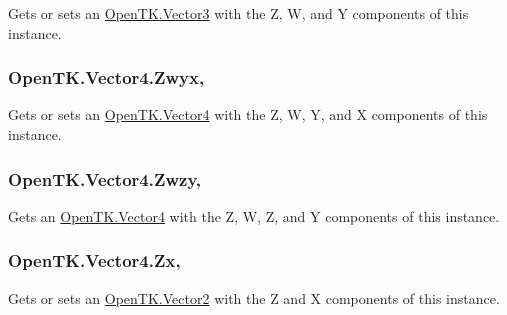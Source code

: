Gets or sets an \hyperlink{struct_open_t_k_1_1_vector3}{Open\-T\-K.\-Vector3} with the Z, W, and Y components of this instance. 

\hypertarget{struct_open_t_k_1_1_vector4_acfd06f4daca5c108a34e8793304e5611}{
\subsubsection[{Zwyx}]{ Open\-T\-K.\-Vector4.\-Zwyx\hspace{0.3cm}{\ttfamily [get]}, {\ttfamily [set]}}}\label{struct_open_t_k_1_1_vector4_acfd06f4daca5c108a34e8793304e5611}


Gets or sets an \hyperlink{struct_open_t_k_1_1_vector4}{Open\-T\-K.\-Vector4} with the Z, W, Y, and X components of this instance. 

\hypertarget{struct_open_t_k_1_1_vector4_a2e2e6a3430dce9badae994c716473602}{
\subsubsection[{Zwzy}]{ Open\-T\-K.\-Vector4.\-Zwzy\hspace{0.3cm}{\ttfamily [get]}, {\ttfamily [set]}}}\label{struct_open_t_k_1_1_vector4_a2e2e6a3430dce9badae994c716473602}


Gets an \hyperlink{struct_open_t_k_1_1_vector4}{Open\-T\-K.\-Vector4} with the Z, W, Z, and Y components of this instance. 

\hypertarget{struct_open_t_k_1_1_vector4_a3262828fe7ba03156975e222a689fbe0}{
\subsubsection[{Zx}]{ Open\-T\-K.\-Vector4.\-Zx\hspace{0.3cm}{\ttfamily [get]}, {\ttfamily [set]}}}\label{struct_open_t_k_1_1_vector4_a3262828fe7ba03156975e222a689fbe0}


Gets or sets an \hyperlink{struct_open_t_k_1_1_vector2}{Open\-T\-K.\-Vector2} with the Z and X components of this instance. 

